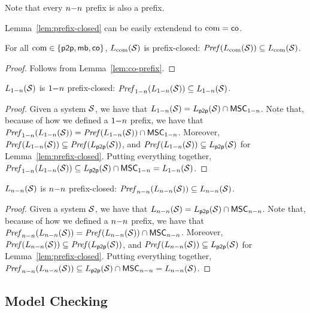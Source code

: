 \documentclass{article}
\begin{document}
\noindent Note that every $\nn$ prefix is also a prefix.

\medskip

Lemma~\ref{lem:prefix-closed} can be easily extendend to $\comsymb = \cosymb$.

\begin{lemma}\label{lem:co-prefix-closed}
	For all $\comsymb \in \{\ppsymb, \mbsymb, \cosymb\}$, $\cL{\Sys}$ is prefix-closed:
	$\Pref{\cL{\Sys}} \subseteq \cL{\Sys}$.
\end{lemma}
\begin{proof}
	Follows from Lemma~\ref{lem:co-prefix}.
\end{proof}

\begin{lemma}\label{lem:onen-prefix-closed}
	$\onenL{\Sys}$ is $\onen$ prefix-closed:
	$\Prefonen{\onenL{\Sys}} \subseteq \onenL{\Sys}$.
\end{lemma}
\begin{proof}
	Given a system $\System$, we have that $\onenL{\System} = \ppL{\System} \cap \onenMSCs$. Note that, because of how we defined a $\onen$ prefix, we have that $\Prefonen{\onenL{\Sys}} = \Pref{\onenL{\Sys}} \cap \onenMSCs$. Moreover, $\Pref{\onenL{\Sys}} \subseteq \Pref{\ppL{\Sys}}$, and $\Pref{\onenL{\Sys}} \subseteq \ppL{\Sys}$ for Lemma~\ref{lem:prefix-closed}. Putting everything together, $\Prefonen{\onenL{\Sys}} \subseteq \ppL{\Sys} \cap \onenMSCs = \onenL{\System}$.
\end{proof}

\begin{lemma}\label{lem:nn-prefix-closed}
	$\nnL{\Sys}$ is $\nn$ prefix-closed:
	$\Prefnn{\nnL{\Sys}} \subseteq \nnL{\Sys}$.
\end{lemma}
\begin{proof}
	Given a system $\System$, we have that $\nnL{\System} = \ppL{\System} \cap \nnMSCs$. Note that, because of how we defined a $\nn$ prefix, we have that $\Prefnn{\nnL{\Sys}} = \Pref{\nnL{\Sys}} \cap \nnMSCs$. Moreover, $\Pref{\nnL{\Sys}} \subseteq \Pref{\ppL{\Sys}}$, and $\Pref{\nnL{\Sys}} \subseteq \ppL{\Sys}$ for Lemma~\ref{lem:prefix-closed}. Putting everything together, $\Prefnn{\nnL{\Sys}} \subseteq \ppL{\Sys} \cap \nnMSCs = \nnL{\System}$.
\end{proof}

\subsection{Model Checking}
\end{document}
